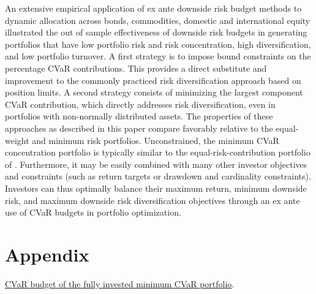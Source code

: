 \documentclass[12pt,a4paper]{article}
\begin{document}
An extensive empirical application of ex ante downside risk budget methods to dynamic allocation across bonds, commodities, domestic and international equity illustrated the out of sample effectiveness of downside risk budgets in generating portfolios that have low portfolio risk and risk concentration, high diversification, and low portfolio turnover. A first strategy is to impose bound constraints on the percentage CVaR contributions. This provides a direct substitute and improvement to the commonly practiced risk diversification approach based on position limits. A second strategy consists of minimizing the largest component CVaR contribution, which directly addresses risk diversification, even in portfolios with non-normally distributed assets. The properties of these approaches as described in this paper compare favorably relative to the equal-weight and minimum risk portfolios. Unconstrained, the minimum CVaR concentration  portfolio is typically similar to the equal-risk-contribution portfolio of \citet{Qian2005}. Furthermore, it may be easily combined with many other investor objectives and constraints (such as return targets or drawdown and cardinality constraints). Investors can thus optimally balance their maximum return, minimum downside risk, and maximum downside risk diversification objectives through an ex ante use of CVaR  budgets in portfolio optimization.


\section{Appendix \label{sec:Appendix}}

\noindent \underline{CVaR budget of the fully invested minimum CVaR portfolio}.
\end{document}
